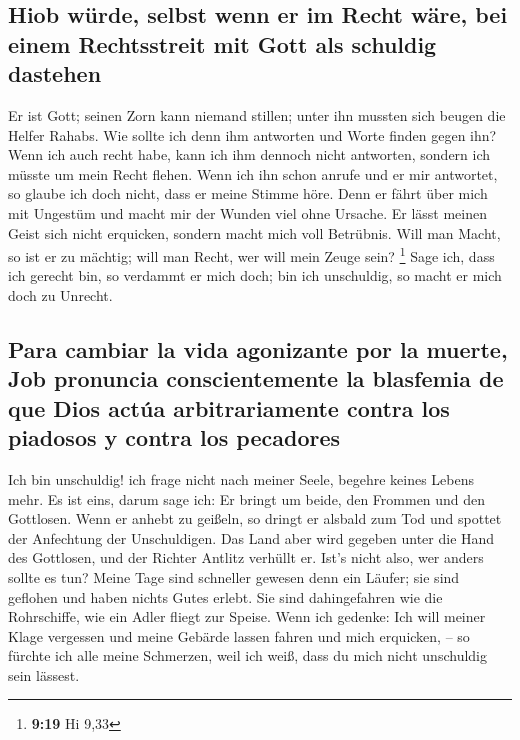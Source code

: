 \hypertarget{hiob-wuxfcrde-selbst-wenn-er-im-recht-wuxe4re-bei-einem-rechtsstreit-mit-gott-als-schuldig-dastehen}{%
\subsection{Hiob würde, selbst wenn er im Recht wäre, bei einem
Rechtsstreit mit Gott als schuldig
dastehen}\label{hiob-wuxfcrde-selbst-wenn-er-im-recht-wuxe4re-bei-einem-rechtsstreit-mit-gott-als-schuldig-dastehen}}

 Er ist Gott; seinen Zorn kann niemand stillen; unter ihn
mussten sich beugen die Helfer Rahabs.  Wie sollte ich
denn ihm antworten und Worte finden gegen ihn?  Wenn ich
auch recht habe, kann ich ihm dennoch nicht antworten, sondern ich
müsste um mein Recht flehen.  Wenn ich ihn schon anrufe
und er mir antwortet, so glaube ich doch nicht, dass er meine Stimme
höre.  Denn er fährt über mich mit Ungestüm und macht mir
der Wunden viel ohne Ursache.  Er lässt meinen Geist sich
nicht erquicken, sondern macht mich voll Betrübnis.  Will
man Macht, so ist er zu mächtig; will man Recht, wer will mein Zeuge
sein? \footnote{\textbf{9:19} Hi 9,33}  Sage ich, dass
ich gerecht bin, so verdammt er mich doch; bin ich unschuldig, so macht
er mich doch zu Unrecht.

\hypertarget{para-cambiar-la-vida-agonizante-por-la-muerte-job-pronuncia-conscientemente-la-blasfemia-de-que-dios-actuxfaa-arbitrariamente-contra-los-piadosos-y-contra-los-pecadores}{%
\subsection{Para cambiar la vida agonizante por la muerte, Job pronuncia
conscientemente la blasfemia de que Dios actúa arbitrariamente contra
los piadosos y contra los
pecadores}\label{para-cambiar-la-vida-agonizante-por-la-muerte-job-pronuncia-conscientemente-la-blasfemia-de-que-dios-actuxfaa-arbitrariamente-contra-los-piadosos-y-contra-los-pecadores}}

 Ich bin unschuldig! ich frage nicht nach meiner Seele,
begehre keines Lebens mehr.  Es ist eins, darum sage ich:
Er bringt um beide, den Frommen und den Gottlosen.  Wenn
er anhebt zu geißeln, so dringt er alsbald zum Tod und spottet der
Anfechtung der Unschuldigen.  Das Land aber wird gegeben
unter die Hand des Gottlosen, und der Richter Antlitz verhüllt er. Ist's
nicht also, wer anders sollte es tun?  Meine Tage sind
schneller gewesen denn ein Läufer; sie sind geflohen und haben nichts
Gutes erlebt.  Sie sind dahingefahren wie die
Rohrschiffe, wie ein Adler fliegt zur Speise.  Wenn ich
gedenke: Ich will meiner Klage vergessen und meine Gebärde lassen fahren
und mich erquicken, --  so fürchte ich alle meine
Schmerzen, weil ich weiß, dass du mich nicht unschuldig sein lässest.

